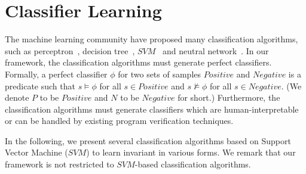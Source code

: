 \section{Classifier Learning}
\label{sec:classifierlearning}

The machine learning community have proposed many classification algorithms, 
such as perceptron~\cite{perceptron}, decision tree~\cite{quinlan1986induction}, $\mathit{SVM}$~\cite{svm:original} and neutral network~\cite{nn}.
In our framework, the classification algorithms must generate perfect classifiers. 
Formally, a perfect classifier $\phi$ for two sets of samples $Positive$ and $Negative$ is a predicate 
such that $s \models \phi$ for all $\mathit{s \in Positive}$ and $\mathit{s \not \models \phi}$ for all $\mathit{s \in Negative}$. 
(We denote $P$ to be $\mathit{Positive}$ and $N$ to be $\mathit{Negative}$ for short.) 
Furthermore, the classification algorithms must generate classifiers which are human-interpretable or can be handled by existing program verification techniques. 

In the following, we present several classification algorithms based on Support Vector Machine ($\mathit{SVM}$) to learn invariant in various forms. 
We remark that our framework is not restricted to $\mathit{SVM}$-based classification algorithms.

